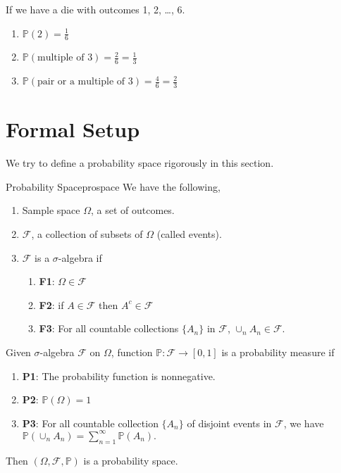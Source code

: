 \begin{example}
If we have a die with outcomes 1, 2, \ldots, 6. 
\begin{enumerate}
    \item $\mathbb{P}(2) = \frac{1}{6}$
    \item $\mathbb{P}(\text{multiple of }3) = \frac{2}{6} = \frac{1}{3}$
    \item \(\mathbb{P}(\text{pair or a multiple of }3) = \frac{4}{6} = \frac{2}{3}\) 
\end{enumerate}
\end{example}
\section{Formal Setup}
We try to define a probability space rigorously in this section.
\begin{definition}{Probability Space}{prospace}
    We have the following,
    \begin{enumerate}
        \item Sample space \(\Omega\), a set of outcomes.
        \item \(\mathcal{F}\), a collection of subsets of \(\Omega\) (called events).
        \item \(\mathcal{F}\) is a \(\sigma\)-algebra if
        \begin{enumerate}
            \item \textbf{F1}: \(\Omega\in\mathcal{F} \)
            \item \textbf{F2}: if \(A \in \mathcal{F} \) then \(A^c \in \mathcal{F} \)
            \item \textbf{F3}: For all countable collections \(\{A_n\}\) in \(\mathcal{F} \), \(\cup_n A_n \in \mathcal{F} \).
        \end{enumerate} 
    \end{enumerate}
    Given \(\sigma\)-algebra \(\mathcal{F}\) on \(\Omega\), function $\mathbb{P}: \mathcal{F} \to [0,1]$ is a probability measure if
    \begin{enumerate}
        \item \textbf{P1}: The probability function is nonnegative.
        \item \textbf{P2}: \(\mathbb{P}(\Omega) = 1\) 
        \item \textbf{P3}: For all countable collection \(\{A_n\}\) of disjoint events in \(\mathcal{F} \), we have
        \(
            \mathbb{P}(\cup_n A_n) = \sum\limits_{n=1}^{\infty} \mathbb{P}(A_n).
        \)
    \end{enumerate}
    Then \((\Omega, \mathcal{F}, \mathbb{P})\) is a probability space. 
\end{definition}


